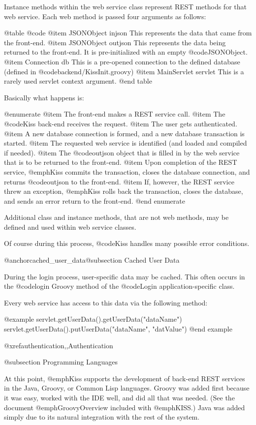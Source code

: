 Instance methods within the web service class represent REST methods
for that web service.  Each web method is passed four arguments as follows:

@table @code
@item JSONObject injson
This represents the data that came from the front-end.
@item JSONObject outjson
This represents the data being returned to the front-end.  It is pre-initialized with an empty @code{JSONObject}.
@item Connection db
This is a pre-opened connection to the defined database (defined in @code{backend/KissInit.groovy})
@item MainServlet servlet
This is a rarely used servlet context argument.
@end table

Basically what happens is:

@enumerate
@item
The front-end makes a REST service call.
@item
The @code{Kiss} back-end receives the request.
@item
The user gets authenticated.
@item
A new database connection is formed, and a new database transaction is started.
@item
The requested web service is identified (and loaded and compiled if needed).
@item
The @code{outjson} object that is filled in by the web service that is to be returned to the front-end.
@item
Upon completion of the REST service, @emph{Kiss} commits the transaction, closes the database connection, and returns @code{outjson} to the front-end.
@item
If, however, the REST service threw an exception, @emph{Kiss} rolls back the transaction, closes the database, and sends an error return to the front-end.
@end enumerate

Additional class and instance methods, that are not web methods, may
be defined and used within web service classes.

Of course during this process, @code{Kiss} handles many possible error conditions.

@anchor{cached_user_data}@subsection Cached User Data

During the login process, user-specific data may be cached.  This
often occurs in the @code{login} Groovy method of the @code{Login}
application-specific class.

Every web service has access to this data via the following method:

@example
        servlet.getUserData().getUserData("dataName")
        servlet.getUserData().putUserData("dataName", "datValue")
@end example

@xref{authentication,,Authentication}

@subsection Programming Languages

At this point, @emph{Kiss} supports the development of back-end REST
services in the Java, Groovy, or Common Lisp languages.  Groovy was
added first because it was easy, worked with the IDE well, and did all
that was needed.  (See the document @emph{GroovyOverview} included
with @emph{KISS}.) Java was added simply due to its natural
integration with the rest of the system.

